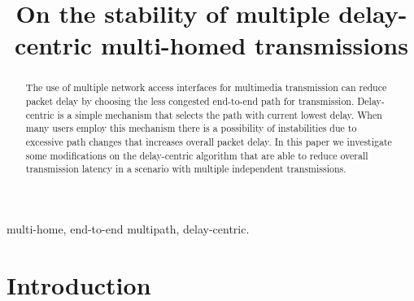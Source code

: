 \documentclass[letterpaper,10pt,oneside,conference,final]{sbrt2015}
\begin{document}
  \IEEEoverridecommandlockouts

  \title{On the stability of multiple delay-centric multi-homed transmissions}
  \author
  {
  }
  \maketitle

  \begin{abstract}
    The use of multiple network access interfaces for multimedia transmission can reduce packet delay by choosing the less congested end-to-end path for transmission. Delay-centric is a simple mechanism that selects the path with current lowest delay. When many users employ this mechanism there is a possibility of instabilities due to excessive path changes that increases overall packet delay. In this paper we investigate some modifications on the delay-centric algorithm that are able to reduce overall transmission latency in a scenario with multiple independent transmissions.
  \end{abstract}

  \begin{keywords}
    multi-home, end-to-end multipath, delay-centric.
  \end{keywords}


  \section{Introduction}
\end{document}
